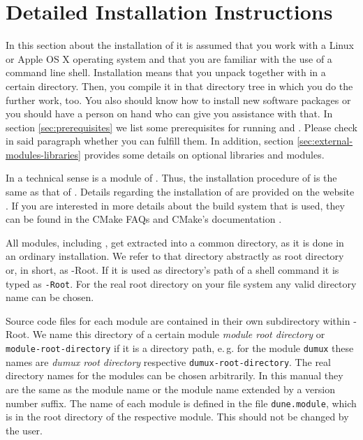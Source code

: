 \section{Detailed Installation Instructions}
\label{install}

In this section about the installation of \Dumux it is assumed that you work with
a Linux or Apple OS X operating system
and that you are familiar with the use of a command line shell. Installation means
that you unpack \Dune together with \Dumux in a certain directory.
Then, you compile it in that directory tree in which you do the further work, too.
You also should know how to install new software packages
or you should have a person on hand who can give you assistance with that. In
section \ref{sec:prerequisites} we list some prerequisites for running \Dune and \Dumux.
Please check in said paragraph whether you can fulfill them. In addition, section
\ref{sec:external-modules-libraries} provides some details on optional libraries and modules.

In a technical sense \Dumux is a module of \Dune.
Thus, the installation procedure of \Dumux is the same as that of \Dune.
Details regarding the installation of \Dune are provided on the \Dune website \cite{DUNE-INST}.
If you are interested in more details about the build system that is used,
they can be found in the {\Dune} CMake FAQs \cite{DUNE-CMAKE} and CMake's documentation \cite{CMAKE-DOC}.

All \Dune modules, including \Dumux, get extracted into a common directory, as it
is done in an ordinary \Dune installation.
We refer to that directory abstractly as {\Dune} root directory or, in short, as {\Dune}-Root.
If it is used as directory's path of a shell command it is typed as \texttt{\Dune-Root}.
For the real {\Dune} root directory on your file system any valid directory name can be chosen.

Source code files for each \Dune module are contained in their own subdirectory
within {\Dune}-Root.
We name this directory of a certain module \emph{module root directory} or
\texttt{module-root-directory} if it is a directory path,
e.\,g. for the module \texttt{dumux} these names are  \emph{dumux root directory}
respective \texttt{dumux-root-directory}.
The real directory names for the modules can be chosen arbitrarily. In this manual
they are the same as the
module name or the module name extended by a version number suffix.
The name of each \Dune module is defined in the file \texttt{dune.module}, which is
in the root
directory of the respective module. This should not be changed by the user.

